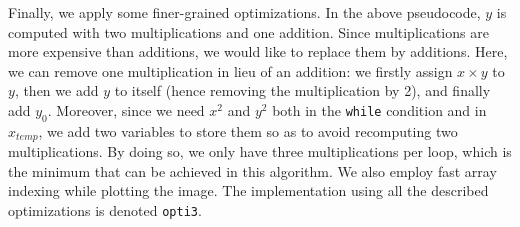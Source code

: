 \documentclass[11pt,a4paper]{article}
\begin{document}
Finally, we apply some finer-grained optimizations.
In the above pseudocode, $y$ is computed with two multiplications and one addition.
Since multiplications are more expensive than additions, we would like to replace them by additions.
Here, we can remove one multiplication in lieu of an addition: we firstly assign $x\times y$ to $y$, then we add $y$ to itself (hence removing the multiplication by 2), and finally add $y_0$.
Moreover, since we need $x^2$ and $y^2$ both in the \texttt{while} condition and in $x_{temp}$, we add two variables to store them so as to avoid recomputing two multiplications.
By doing so, we only have three multiplications per loop, which is the minimum that can be achieved in this algorithm.
We also employ fast array indexing while plotting the image.
The implementation using all the described optimizations is denoted \texttt{opti3}.\\[-7pt]
\end{document}
